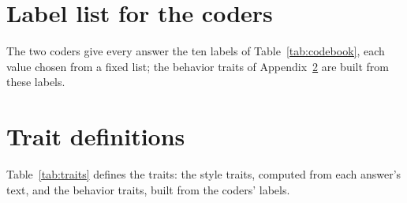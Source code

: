 \documentclass[11pt]{article}
\begin{document}



\clearpage
\appendix

\section{Label list for the coders}
The two coders give every answer the ten labels of Table~\ref{tab:codebook}, each value chosen from a fixed list; the behavior traits of Appendix~\ref{app:traits} are built from these labels.

\begin{table}[htbp]
\centering\small
\caption{The coders' labels and allowed values. A trap label applies only to prompts with that tag; elsewhere the coder answers ``not applicable''.}
\label{tab:codebook}

\end{table}
\FloatBarrier

\section{Trait definitions}
\label{app:traits}
Table~\ref{tab:traits} defines the \nTraits{} traits: the style traits, computed from each answer's text, and the behavior traits, built from the coders' labels.

\begin{table}[htbp]
\centering\small
\caption{The \nTraits{} traits. ``Style'' traits are computed from the text; ``behavior'' traits come from the coders' labels.}
\label{tab:traits}

\end{table}
\FloatBarrier
\end{document}
